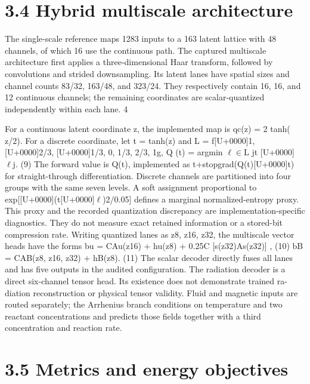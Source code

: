 \documentclass[11pt]{article}
\begin{document}
\section*{3.4 Hybrid multiscale architecture}

The single-scale reference maps 1283 inputs to a 163 latent lattice with 48 channels, of which 16 use
the continuous path. The captured multiscale architecture first applies a three-dimensional Haar
transform, followed by convolutions and strided downsampling. Its latent lanes have spatial sizes
and channel counts 83/32, 163/48, and 323/24. They respectively contain 16, 16, and 12 continuous
channels; the remaining coordinates are scalar-quantized independently within each lane.
4

For a continuous latent coordinate z, the implemented map is qc(z) = 2 tanh( z/2). For a discrete
coordinate, let t = tanh(z) and
L = f[U+0000]1, [U+0000]2/3, [U+0000]1/3, 0, 1/3, 2/3, 1g, Q (t) = argmin
\ensuremath{\ell}\ensuremath{\in}L
jt [U+0000] \ensuremath{\ell}j. (9)
The forward value is Q(t), implemented as t+stopgrad(Q(t)[U+0000]t) for straight-through differentiation.
Discrete channels are partitioned into four groups with the same seven levels. A soft assignment
proportional to exp[[U+0000](t[U+0000]\ensuremath{\ell})2/0.05] defines a marginal normalized-entropy proxy. This proxy and the
recorded quantization discrepancy are implementation-specific diagnostics. They do not measure
exact retained information or a stored-bit compression rate.
Writing quantized lanes as z8, z16, z32, the multiscale vector heads have the forms
bu = CAu(z16) + hu(z8) + 0.25C [s(z32)As(z32)] , (10)
bB = CAB(z8, z16, z32) + hB(z8). (11)
The scalar decoder directly fuses all lanes and has five outputs in the audited configuration. The
radiation decoder is a direct six-channel tensor head. Its existence does not demonstrate trained ra-
diation reconstruction or physical tensor validity. Fluid and magnetic inputs are routed separately;
the Arrhenius branch conditions on temperature and two reactant concentrations and predicts those
fields together with a third concentration and reaction rate.

\section*{3.5 Metrics and energy objectives}
\end{document}
